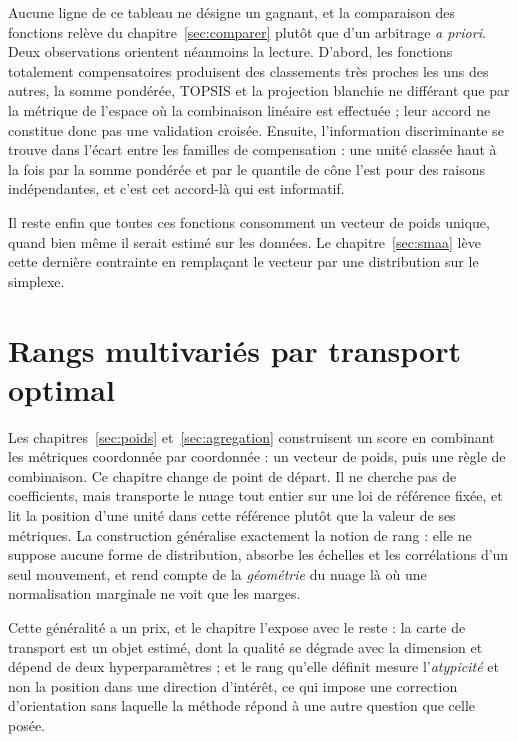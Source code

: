 \documentclass[11pt,a4paper]{article}
\theoremstyle{definition}
\theoremstyle{remark}
\begin{document}
\bigskip

Aucune ligne de ce tableau ne désigne un gagnant, et la comparaison des fonctions relève
du chapitre~\ref{sec:comparer} plutôt que d'un arbitrage \emph{a priori}. Deux
observations orientent néanmoins la lecture. D'abord, les fonctions totalement
compensatoires produisent des classements très proches les uns des autres, la somme
pondérée, TOPSIS et la projection blanchie ne différant que par la métrique de l'espace où
la combinaison linéaire est effectuée ; leur accord ne constitue donc pas une validation
croisée. Ensuite, l'information discriminante se trouve dans l'écart entre les familles de
compensation : une unité classée haut à la fois par la somme pondérée et par le quantile
de cône l'est pour des raisons indépendantes, et c'est cet accord-là qui est informatif.

\bigskip

Il reste enfin que toutes ces fonctions consomment un vecteur de poids unique, quand bien
même il serait estimé sur les données. Le chapitre~\ref{sec:smaa} lève cette dernière
contrainte en remplaçant le vecteur par une distribution sur le simplexe.

\section{Rangs multivariés par transport optimal}
\label{sec:ot}

\medskip

Les chapitres~\ref{sec:poids} et~\ref{sec:agregation} construisent un score en combinant
les métriques coordonnée par coordonnée : un vecteur de poids, puis une règle de
combinaison. Ce chapitre change de point de départ. Il ne cherche pas de coefficients, mais
transporte le nuage tout entier sur une loi de référence fixée, et lit la position d'une
unité dans cette référence plutôt que la valeur de ses métriques. La construction
généralise exactement la notion de rang : elle ne suppose aucune forme de distribution,
absorbe les échelles et les corrélations d'un seul mouvement, et rend compte de la
\emph{géométrie} du nuage là où une normalisation marginale ne voit que les marges.

\bigskip

Cette généralité a un prix, et le chapitre l'expose avec le reste : la carte de transport
est un objet estimé, dont la qualité se dégrade avec la dimension et dépend de deux
hyperparamètres ; et le rang qu'elle définit mesure l'\emph{atypicité} et non la position
dans une direction d'intérêt, ce qui impose une correction d'orientation sans laquelle la
méthode répond à une autre question que celle posée.
\end{document}
